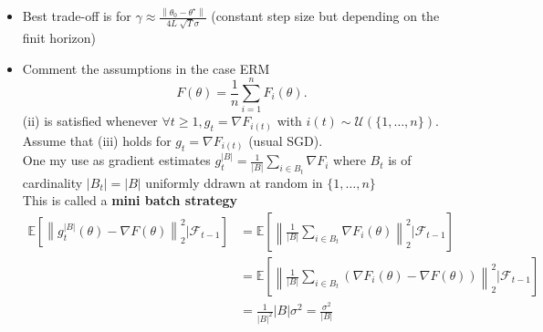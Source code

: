 \begin{note}
\begin{itemize}
        \item Best trade-off is for $ \gamma \approx \frac{\left\| \theta _0 - \theta ^\star  \right\| }{4L \sqrt[]{T} \sigma } $ (constant step size but depending on the finit horizon)
        \item Comment the assumptions in the case ERM 
        \[
            F(\theta ) = \frac{1}{n} \sum_{i=1}^{n} F_i(\theta )
        .\]
        (ii) is satisfied whenever $ \forall t \geq 1, g_t = \nabla F_{i(t)} $ with $ i(t) \sim \mathcal{U}(\{1, \dots, n\})  $. \\
        Assume that (iii) holds for $ g_t = \nabla F_{i(t)} $ (usual SGD). \\
        One my use as gradient estimates $ g_t^{\left| B \right| } = \frac{1}{\left| B \right| } \sum_{i \in B_t} \nabla F_i$ where $ B_t $ is of cardinality $ \left| B_t \right| = \left| B \right|  $ uniformly ddrawn at random in $ \{ 1, \dots, n \} $  \\
        This is called a  \textbf{mini batch strategy}
        \begin{align*}
            \mathbb{E} [\left\| g_t^{\left| B \right| } (\theta ) - \nabla F(\theta)  \right\| ^2_2| \mathcal{F}_{t-1} ]
                &= \mathbb{E}[ \left\| \frac{1}{\left| B \right| } \sum_{i \in B_t}^{} \nabla F_i (\theta )  \right\| _2 ^2 | \mathcal{F}_{t-1} ] \\
                &= \mathbb{E}[ \left\| \frac{1}{\left| B \right| } \sum_{i \in B_t}^{} ( \nabla F_i (\theta ) - \nabla F(\theta )) \right\| _2 ^2 | \mathcal{F}_{t-1}] \\
                &= \frac{1}{\left| B \right|^2 } \left| B \right| \sigma ^2 = \frac{\sigma ^2}{\left| B \right| }
        \end{align*}
    \end{itemize}
\end{note}

